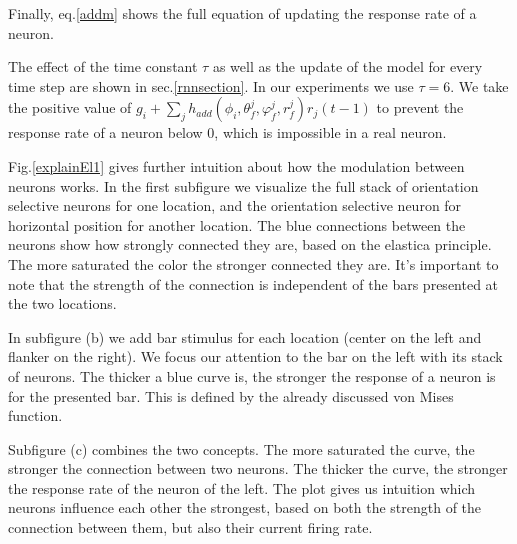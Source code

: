 Finally, eq.\ref{addm} shows the full equation of updating the response rate of a neuron.


The effect of the time constant $\tau$ as well as the update of the model for every time step are shown in sec.\ref{rnnsection}. In our experiments we use $\tau=6$. We take the positive value of $g_{i}+\sum_{j}h_{add}(\phi_{i},\theta_{f}^{j},\varphi_{f}^{j},r_{f}^{j})r_{j}(t-1)$ to prevent the response rate of a neuron below 0, which is impossible in a real neuron.



Fig.\ref{explainEl1} gives further intuition about how the modulation between neurons works. In the first subfigure we visualize the full stack of orientation selective neurons for one location, and the orientation selective neuron for horizontal position for another location. The blue connections between the neurons show how strongly connected they are, based on the elastica principle. The more saturated the color the stronger connected they are. It's important to note that the strength of the connection is independent of the bars presented at the two locations.


In subfigure (b) we add bar stimulus for each location (center on the left and flanker on the right). We focus our attention to the bar on the left with its stack of neurons. The thicker a blue curve is, the stronger the response of a neuron is for the presented bar. This is defined by the already discussed von Mises function.

Subfigure (c) combines the two concepts. The more saturated the curve, the stronger the connection between two neurons. The thicker the curve, the stronger the response rate of the neuron of the left. The plot gives us intuition which neurons influence each other the strongest, based on both the strength of the connection between them, but also their current firing rate. 

